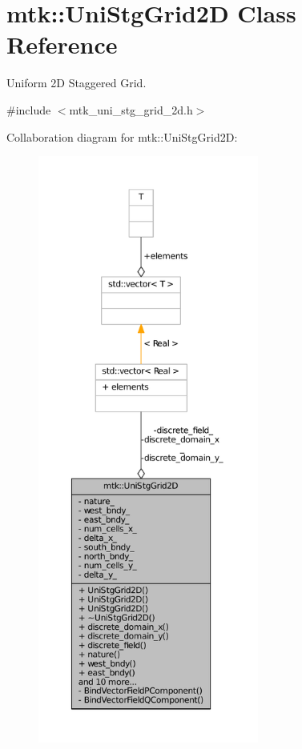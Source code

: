 \hypertarget{classmtk_1_1UniStgGrid2D}{\section{mtk\+:\+:Uni\+Stg\+Grid2\+D Class Reference}
\label{classmtk_1_1UniStgGrid2D}
}


Uniform 2\+D Staggered Grid.  




{\ttfamily \#include $<$mtk\+\_\+uni\+\_\+stg\+\_\+grid\+\_\+2d.\+h$>$}



Collaboration diagram for mtk\+:\+:Uni\+Stg\+Grid2\+D\+:\nopagebreak
\begin{figure}[H]
\begin{center}
\leavevmode
\includegraphics[height=550pt]{classmtk_1_1UniStgGrid2D__coll__graph}
\end{center}
\end{figure}

